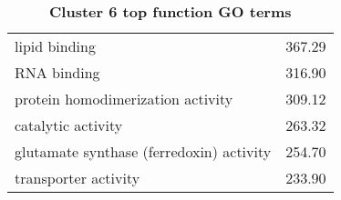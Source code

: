 \begin{table}[hp]
\begin{center}
\begin{tabular}{p{}r}
lipid binding                                                 & 367.29                      \\
RNA binding                                                   & 316.90                      \\
protein homodimerization activity                             & 309.12                      \\ %
catalytic activity                                            & 263.32                      \\
glutamate synthase (ferredoxin) activity                      & 254.70                      \\ %
transporter activity                                          & 233.90                      \\ \bottomrule
\end{tabular}
\end{center}

\caption[Cluster 6 top function GO terms]{\sf \textbf{Cluster 6 top function GO terms}}
\label{tab:cls6-function}
\end{table}